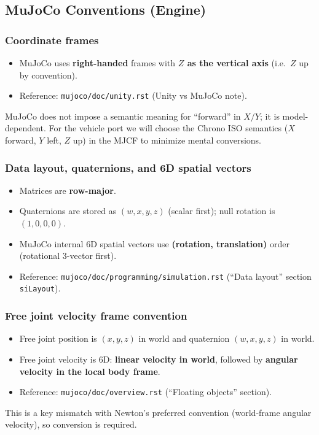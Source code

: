 \subsection{MuJoCo Conventions (Engine)}

\subsubsection{Coordinate frames}
\begin{itemize}
  \item MuJoCo uses \textbf{right-handed} frames with \textbf{$Z$ as the vertical axis} (i.e.\ $Z$ up by convention).
  \item Reference: \texttt{mujoco/doc/unity.rst} (Unity vs MuJoCo note).
\end{itemize}
MuJoCo does not impose a semantic meaning for ``forward'' in $X/Y$; it is model-dependent. For the vehicle port we will
choose the Chrono ISO semantics ($X$ forward, $Y$ left, $Z$ up) in the MJCF to minimize mental conversions.

\subsubsection{Data layout, quaternions, and 6D spatial vectors}
\begin{itemize}
  \item Matrices are \textbf{row-major}.
  \item Quaternions are stored as \textbf{$(w, x, y, z)$} (scalar first); null rotation is $(1,0,0,0)$.
  \item MuJoCo internal 6D spatial vectors use \textbf{(rotation, translation)} order (rotational 3-vector first).
  \item Reference: \texttt{mujoco/doc/programming/simulation.rst} (``Data layout'' section \texttt{siLayout}).
\end{itemize}

\subsubsection{Free joint velocity frame convention}
\begin{itemize}
  \item Free joint position is $(x,y,z)$ in world and quaternion $(w,x,y,z)$ in world.
  \item Free joint velocity is 6D: \textbf{linear velocity in world}, followed by \textbf{angular velocity in the local body frame}.
  \item Reference: \texttt{mujoco/doc/overview.rst} (``Floating objects'' section).
\end{itemize}
\noindent
This is a key mismatch with Newton's preferred convention (world-frame angular velocity), so conversion is required.

